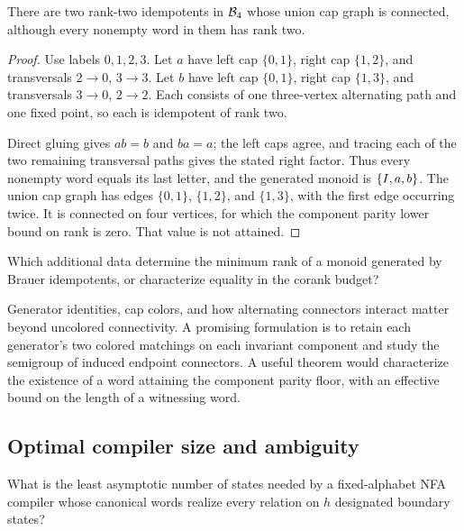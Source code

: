 \begin{proposition}
\label{btc:research:union-obstruction}
There are two rank-two idempotents in $\mathcal{B}_{4}$ whose union cap
graph is connected, although every nonempty word in them has
rank two.
\end{proposition}

\begin{proof}
Use labels $0,1,2,3$. Let $a$ have left cap $\{0,1\}$, right
cap $\{1,2\}$, and transversals $2\to0$, $3\to3$.
Let $b$ have left cap $\{0,1\}$, right cap $\{1,3\}$, and
transversals $3\to0$, $2\to2$. Each consists of one
three-vertex alternating path and one fixed point, so each is
idempotent of rank two.

Direct gluing gives $ab=b$ and $ba=a$; the left caps agree,
and tracing each of the two remaining transversal paths
gives the stated right factor. Thus every nonempty word
equals its last letter, and the generated monoid is
$\{I,a,b\}$.
The union cap graph has edges $\{0,1\}$, $\{1,2\}$, and
$\{1,3\}$, with the first edge occurring twice. It is connected
on four vertices, for which the component parity lower bound
on rank is zero. That value is not attained.
\end{proof}

\begin{question}
Which additional data determine the minimum rank of a monoid
generated by Brauer idempotents, or characterize equality in
the corank budget?
\end{question}

Generator identities, cap colors, and how alternating
connectors interact matter beyond uncolored connectivity.
A promising formulation is to retain each generator's
two colored matchings on each invariant component and study
the semigroup of induced endpoint connectors. A useful
theorem would characterize the existence of a word attaining
the component parity floor, with an effective bound on the
length of a witnessing word.

\subsection{Optimal compiler size and ambiguity}

\begin{question}
What is the least asymptotic number of states needed by a
fixed-alphabet NFA compiler whose canonical words realize
every relation on $h$ designated boundary states?
\end{question}

